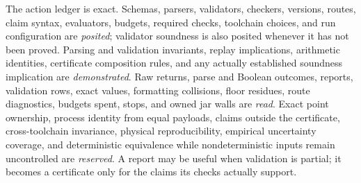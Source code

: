 The action ledger is exact.  Schemas, parsers, validators, checkers, versions, routes, claim syntax, evaluators,
budgets, required checks, toolchain choices, and run configuration are \emph{posited}; validator soundness is also
posited whenever it has not been proved.  Parsing and validation invariants, replay implications, arithmetic identities,
certificate composition rules, and any actually established soundness implication are \emph{demonstrated}.  Raw returns,
parse and Boolean outcomes, reports, validation rows, exact values, formatting collisions, floor residues, route
diagnostics, budgets spent, stops, and owned jar walls are \emph{read}.  Exact point ownership, process identity from
equal payloads, claims outside the certificate, cross-toolchain invariance, physical reproducibility, empirical
uncertainty coverage, and deterministic equivalence while nondeterministic inputs remain uncontrolled are
\emph{reserved}.  A report may be useful when validation is partial; it becomes a certificate only for the claims its
checks actually support.
